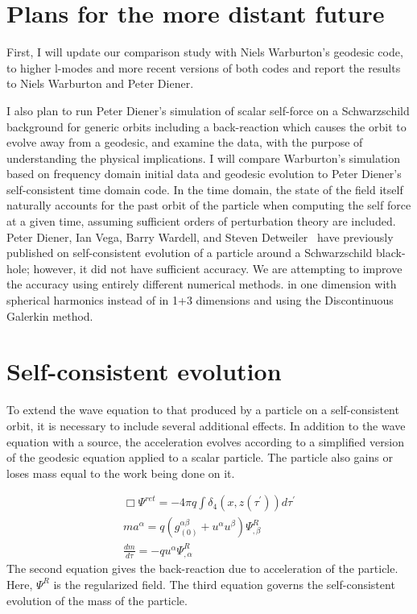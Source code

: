 \section{Plans for the more distant future}
First, I will update our comparison study with Niels Warburton's geodesic code, to higher l-modes and more recent versions of both codes and report the results to Niels Warburton and Peter Diener.  

I also plan to run Peter Diener's simulation of scalar self-force on a Schwarzschild background for generic orbits including a back-reaction which causes the orbit to evolve away from a geodesic, and examine the data, with the purpose of understanding the physical implications. I will compare Warburton's simulation based on frequency domain initial data and geodesic evolution to Peter Diener's self-consistent time domain code. In the time domain, the state of the field itself naturally accounts for the past orbit of the particle when computing the self force at a given time, assuming sufficient orders of perturbation theory are included. Peter Diener, Ian Vega, Barry Wardell, and Steven Detweiler~\cite{diener_vega_wardell_detweiler_2012} have previously published on self-consistent evolution of a particle around a Schwarzschild black-hole; however, it did not have sufficient accuracy. We are attempting to improve the accuracy using entirely different numerical methods.  in one dimension with spherical harmonics instead of in 1+3 dimensions and using the Discontinuous Galerkin method. 

\section{Self-consistent evolution}
To extend the wave equation to that produced by a particle on a self-consistent orbit, it is necessary to include several additional effects. In addition to the wave equation with a source, the acceleration evolves according to a simplified version of the geodesic equation applied to a scalar particle. The particle also gains or loses mass equal to the work being done on it. 

\begin{eqnarray}
  \Box\Psi^{ret} = -4\pi q \int\delta_4(x,z(\tau^\prime))d\tau^\prime\\
    ma^\alpha=q(g^{\alpha\beta}_{(0)}+u^\alpha u^\beta)\Psi^{R}_{,\beta}\\
    \frac{dm}{d\tau}=-q u^\alpha\Psi^R_{,\alpha}
    \label{genericev}
\end{eqnarray}
The second equation gives the back-reaction due to acceleration of the particle. Here, $\Psi^R$ is the regularized field. The third equation governs the self-consistent evolution of the mass of the particle.~\cite{WardellSelfForceReview}

